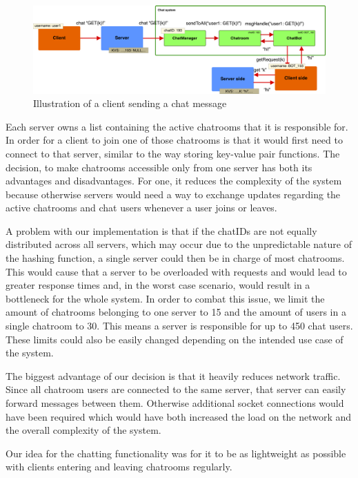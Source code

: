 \begin{figure}[h]
	\centering
	\includegraphics[width=\linewidth]{figures/chatsystem.png}
	\caption{Illustration of a client sending a chat message}
	\label{fig:chatsystem}
\end{figure}

Each server owns a list containing the active chatrooms that it is responsible for. In order for a client to join one of those chatrooms is that it would first need to connect to that server, similar to the way storing key-value pair functions. The decision, to make chatrooms accessible only from one server has both its advantages and disadvantages. For one, it reduces the complexity of the system because otherwise servers would need a way to exchange updates regarding the active chatrooms and chat users whenever a user joins or leaves.

A problem with our implementation is that if the chatIDs are not equally distributed across all servers, which may occur due to the unpredictable nature of the hashing function, a single server could then be in charge of most chatrooms. This would cause that a server to be overloaded with requests and would lead to greater response times and, in the worst case scenario, would result in a bottleneck for the whole system. In order to combat this issue, we limit the amount of chatrooms belonging to one server to 15 and the amount of users in a single chatroom to 30. This means a server is responsible for up to 450 chat users. These limits could also be easily changed depending on the intended use case of the system.

The biggest advantage of our decision is that it heavily reduces network traffic. Since all chatroom users are connected to the same server, that server can easily forward messages between them. Otherwise additional socket connections would have been required which would have both increased the load on the network and the overall complexity of the system.

Our idea for the chatting functionality was for it to be as lightweight as possible with clients entering and leaving chatrooms regularly.

